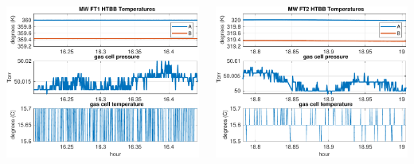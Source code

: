 \documentclass[9pt]{beamer}
\begin{document}
\begin{frame}
\begin{columns}[t]
\begin{column}{0.45\textwidth}
  \begin{centering}
  \includegraphics[width=\textwidth]{harvest_02-11/02-11_MW_FT1.pdf}
  \end{centering}
\end{column}
\begin{column}{0.45\textwidth}  
  \begin{centering}
  \includegraphics[width=\textwidth]{harvest_02-11/02-11_MW_FT2.pdf}
  \end{centering}
\end{column}
\end{columns}

\end{frame}
\end{document}
